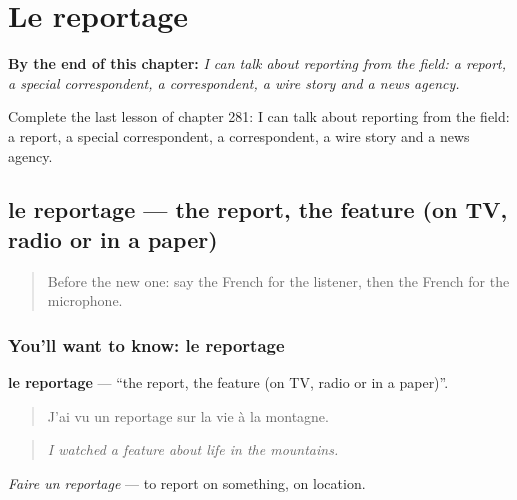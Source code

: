 
\chapter{Le reportage}
\label{ch:fr-le-reportage}

\begin{chapteropening}
\textbf{By the end of this chapter:} \emph{I can talk about reporting from the field: a report, a special correspondent, a correspondent, a wire story and a news agency.}

Complete the last lesson of chapter 281: I can talk about reporting from the field: a report, a special correspondent, a correspondent, a wire story and a news agency.
\end{chapteropening}

\section[le reportage]{le reportage — the report, the feature (on TV, radio or in a paper)}

\label{lesson:FR-C281-reportage}



\begin{quote}
Before the new one: say the French for the listener, then the French for the microphone.
\end{quote}

\subsection*{You'll want to know: le reportage}
\textbf{le reportage} — \textquotedblleft{}the report, the feature (on TV, radio or in a paper)\textquotedblright{}.

\begin{quote}
J'ai vu un reportage sur la vie à la montagne.
\end{quote}

\begin{quote}
\emph{I watched a feature about life in the mountains.}
\end{quote}

\emph{Faire un reportage} — to report on something, on location.

